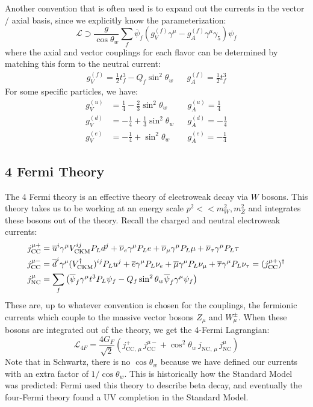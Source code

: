 \documentclass[11pt, oneside]{article}   	%
\theoremstyle{definition}
\numberwithin{equation}{subsection}		%
\begin{document}
Another convention that is often used is to expand out the currents in the vector / axial basis, since we explicitly know the 
parameterization:
\begin{equation}
	\mathcal L\supset \frac{g}{\cos\theta_w} \sum_f \overline\psi_f \left(g_V^{(f)} \gamma^\mu - g_A^{(f)}
	\gamma^\mu\gamma_5\right) \psi_f
\end{equation}
where the axial and vector couplings for each flavor can be determined by matching this form to the neutral current:
\begin{align}
	g_V^{(f)} = \frac{1}{2} t^3_f - Q_f\sin^2\theta_w && g_A^{(f)} = \frac{1}{2} t^3_f
\end{align}
For some specific particles, we have:
\begin{align}
	g_V^{(u)} &= \frac{1}{4} - \frac{2}{3}\sin^2\theta_w && g_A^{(u)} = \frac{1}{4} \\
	g_V^{(d)} &= -\frac{1}{4} + \frac{1}{3}\sin^2\theta_w && g_A^{(d)} = -\frac{1}{4} \\
	g_V^{(e)} &= -\frac{1}{4} + \sin^2\theta_w && g_A^{(e)} = -\frac{1}{4}
\end{align}

\subsection{4 Fermi Theory}

The 4 Fermi theory is an effective theory of electroweak decay via $W$ bosons. This theory takes us to be working at an energy scale 
$p^2 << m_W^2, m_Z^2$ and integrates these bosons out of the theory. Recall the charged and neutral electroweak currents:
\begin{align}
	j_{\textnormal{CC}}^{\mu +} &= \overline u^i \gamma^\mu V^{ij}_\mathrm{CKM} P_L d^j +  \overline\nu_e \gamma^\mu P_L e + \overline\nu_\mu 
	\gamma^\mu P_L \mu + \overline\nu_\tau \gamma^\mu P_L \tau \\
	j_{\textnormal{CC}}^{\mu -} &= \overline d^i \gamma^\mu (V_\mathrm{CKM}^\dagger)^{ij} P_L u^j + \overline e \gamma^\mu 
	P_L\nu_e + \overline \mu \gamma^\mu P_L \nu_\mu + \overline\tau \gamma^\mu P_L\nu_\tau = (j_\mathrm{CC}^{\mu +})^\dagger 
	\\
	j_\mathrm{NC}^\mu &= \sum_f \left( \overline\psi_f \gamma^\mu t^3 P_L\psi_f - Q_f\sin^2\theta_w \overline\psi_f\gamma^\mu\psi_f \right)
\end{align}
These are, up to whatever convention is chosen for the couplings, the fermionic currents which couple to the massive vector bosons 
$Z_\mu$ and $W_\mu^\pm$. When these bosons are integrated out of the theory, we get the 4-Fermi Lagrangian:
\begin{equation}
	\mathcal L_{4F} = \frac{4 G_F}{\sqrt 2} \left(j_{\mathrm{CC},\,\mu}^+ \, j_\mathrm{CC}^{\mu -} + \cos^2\theta_w \, j_{\mathrm{NC},\,\mu}
	\,j_\mathrm{NC}^\mu\right)
\end{equation}
Note that in Schwartz, there is no $\cos\theta_w$ because we have defined our currents with an extra factor of $1 / \cos\theta_w$. 
This is historically how the Standard Model was predicted: Fermi used this theory to describe beta decay, and eventually the four-Fermi 
theory found a UV completion in the Standard Model. 
\end{document}
